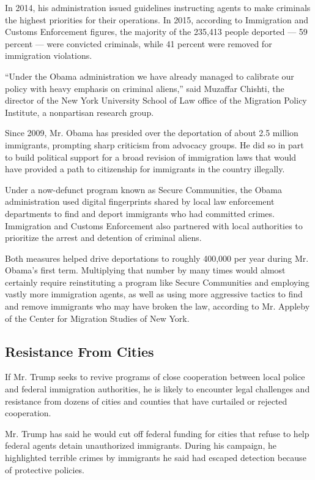 In 2014, his administration issued guidelines instructing agents to make
criminals the highest priorities for their operations. In 2015,
according to Immigration and Customs Enforcement figures, the majority
of the 235,413 people deported --- 59 percent --- were convicted
criminals, while 41 percent were removed for immigration violations.

``Under the Obama administration we have already managed to calibrate
our policy with heavy emphasis on criminal aliens,'' said Muzaffar
Chishti, the director of the New York University School of Law office of
the Migration Policy Institute, a nonpartisan research group.

Since 2009, Mr. Obama has presided over the deportation of about 2.5
million immigrants, prompting sharp criticism from advocacy groups. He
did so in part to build political support for a broad revision of
immigration laws that would have provided a path to citizenship for
immigrants in the country illegally.

Under a now-defunct program known as Secure Communities, the Obama
administration used digital fingerprints shared by local law enforcement
departments to find and deport immigrants who had committed crimes.
Immigration and Customs Enforcement also partnered with local
authorities to prioritize the arrest and detention of criminal aliens.

Both measures helped drive deportations to roughly 400,000 per year
during Mr. Obama's first term. Multiplying that number by many times
would almost certainly require reinstituting a program like Secure
Communities and employing vastly more immigration agents, as well as
using more aggressive tactics to find and remove immigrants who may have
broken the law, according to Mr. Appleby of the Center for Migration
Studies of New York.

\hypertarget{resistance-from-cities}{%
\subsection{Resistance From Cities}\label{resistance-from-cities}}

If Mr. Trump seeks to revive programs of close cooperation between local
police and federal immigration authorities, he is likely to encounter
legal challenges and resistance from dozens of cities and counties that
have curtailed or rejected cooperation.

Mr. Trump has said he would cut off federal funding for cities that
refuse to help federal agents detain unauthorized immigrants. During his
campaign, he highlighted terrible crimes by immigrants he said had
escaped detection because of protective policies.

